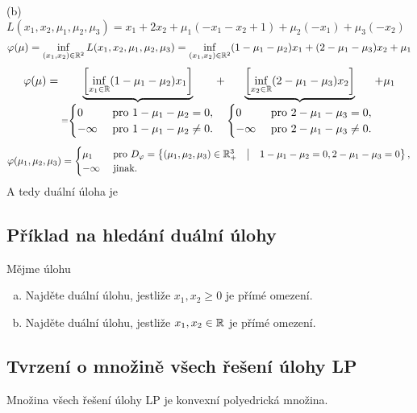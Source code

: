 (b) $L(x_1, x_2, \mu_1, \mu_2, \mu_3) = x_1 + 2x_2 + \mu_1(-x_1 -x_2 + 1) + \mu_2(-x_1) + \mu_3(-x_2)$
\[
    \varphi(\mu) = \inf_{(x_1, x_2) \in \mathbb{R}^2} L(x_1, x_2, \mu_1, \mu_2, \mu_3) = \inf_{(x_1, x_2) \in \mathbb{R}^2} 
    (1-\mu_1 - \mu_2)x_1 + (2-\mu_1-\mu_3)x_2 + \mu_1
\]
\[
    \varphi(\mu) = \underbrace{\left[\inf_{x_1 \in \mathbb{R}}(1-\mu_1-\mu_2)x_1\right]}_{=
    \begin{cases}
        0 & \text{ pro } 1-\mu_1-\mu_2 = 0, \\
        -\infty & \text{ pro } 1-\mu_1-\mu_2 \not= 0.
    \end{cases}} + \underbrace{\left[\inf_{x_2 \in \mathbb{R}}(2 - \mu_1 - \mu_3)x_2\right]}_{
    \begin{cases}
        0 & \text{ pro } 2-\mu_1-\mu_3 = 0, \\
        -\infty & \text{ pro } 2-\mu_1-\mu_3 \not= 0.
    \end{cases}} + \mu_1
\]
\[
    \varphi(\mu_1, \mu_2, \mu_3) = 
    \begin{cases}
        \mu_1 &\text{ pro } D_\varphi = \left\lbrace (\mu_1, \mu_2, \mu_3) \in \mathbb{R}^3_+ \quad \middle| \quad 1-\mu_1-\mu_2 = 0, 
         2-\mu_1-\mu_3 = 0 \right\rbrace, \\
        - \infty & \text{ jinak.}
    \end{cases}
\]
A tedy duální úloha je

\subsection{Příklad na hledání duální úlohy}
Mějme úlohu
\begin{enumerate}[(a)]
    \item Najděte duální úlohu, jestliže $x_1, x_2 \geq 0$ je přímé omezení.
    \item Najděte duální úlohu, jestliže $x_1, x_2 \in \mathbb{R}$ je přímé omezení.
\end{enumerate}

\subsection{Tvrzení o množině všech řešení úlohy LP}
Množina všech řešení úlohy LP je konvexní polyedrická množina.

